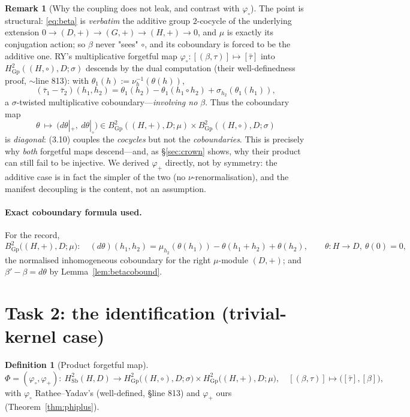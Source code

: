 \documentclass[11pt]{article}
\theoremstyle{definition}
\newtheorem{definition}[theorem]{Definition}
\newtheorem{remark}[theorem]{Remark}
\newcommand{\Sb}{\mathrm{Sb}}
\newcommand{\Gp}{\mathrm{Gp}}
\begin{document}
\begin{remark}[Why the coupling does not leak, and contrast with $\varphi_\circ$]\label{rem:diagonal}
The point is structural: \eqref{eq:beta} is \emph{verbatim} the additive group $2$-cocycle of
the underlying extension $0\to(D,+)\to(G,+)\to(H,+)\to0$, and $\mu$ is exactly its conjugation
action; so $\beta$ never "sees" $\circ$, and its coboundary is forced to be the additive one.
RY's multiplicative forgetful map $\varphi_\circ:[(\beta,\tau)]\mapsto[\bar\tau]$ into
$H^2_\Gp((H,\circ),D;\sigma)$ descends by the dual computation (their well-definedness proof,
$\sim$line 813): with $\theta_1(h):=\nu_h^{-1}(\theta(h))$,
\[
(\bar\tau_1-\bar\tau_2)(h_1,h_2)=\theta_1(h_2)-\theta_1(h_1\circ h_2)+\sigma_{h_2}(\theta_1(h_1)),
\]
a $\sigma$-twisted multiplicative coboundary---\emph{involving no $\beta$}. Thus the
coboundary map
\[
\theta\ \longmapsto\ \bigl(d\theta|_+,\ d\theta|_\circ\bigr)\in
B^2_\Gp((H,+),D;\mu)\times B^2_\Gp((H,\circ),D;\sigma)
\]
is \emph{diagonal}: (3.10) couples the \emph{cocycles} but not the \emph{coboundaries}.
This is precisely why \emph{both} forgetful maps descend---and, as \S\ref{sec:crown} shows, why
their product can still fail to be injective. We derived $\varphi_+$ directly, not by symmetry:
the additive case is in fact the simpler of the two (no $\nu$-renormalisation), and the
manifest decoupling is the content, not an assumption.
\end{remark}

\paragraph{Exact coboundary formula used.} For the record,
\[
B^2_\Gp\bigl((H,+),D;\mu\bigr):\quad
(d\theta)(h_1,h_2)=\mu_{h_2}(\theta(h_1))-\theta(h_1+h_2)+\theta(h_2),\qquad \theta:H\to D,\ \theta(0)=0,
\]
the normalised inhomogeneous coboundary for the right $\mu$-module $(D,+)$; and
$\beta'-\beta=d\theta$ by Lemma~\ref{lem:betacobound}.

\section{Task 2: the identification (trivial-kernel case)}\label{sec:assemble}

\begin{definition}[Product forgetful map]
\[
\Phi=(\varphi_\circ,\varphi_+):\ H^2_\Sb(H,D)\longrightarrow
H^2_\Gp\bigl((H,\circ),D;\sigma\bigr)\times H^2_\Gp\bigl((H,+),D;\mu\bigr),\quad
[(\beta,\tau)]\mapsto\bigl([\bar\tau],[\beta]\bigr),
\]
with $\varphi_\circ$ Rathee--Yadav's (well-defined, \S line 813) and $\varphi_+$ ours
(Theorem~\ref{thm:phiplus}).
\end{definition}
\end{document}
